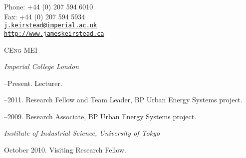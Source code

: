 \documentclass[11pt,a4paper]{article}
\makeatletter
\def\myemail{j.keirstead@imperial.ac.uk}
\def\myweb{http://www.jameskeirstead.ca}
\def\myphone{+44 (0) 207 594 6010}
\def\myfax{+44 (0) 207 594 5934}
\makeatother
\begin{document}
\begin{minipage}[t]{2.95in}
\end{minipage}
\hfill     
\hfill
\begin{minipage}[t]{1.7in}
  \flushright \footnotesize Phone: \myphone \\ 
  Fax: \myfax  \\ 
  {\scriptsize  \texttt{\href{mailto:\myemail}{\myemail}}} \\
  {\scriptsize  \texttt{\href{\myweb}{\myweb}}}
\end{minipage}


\bigskip

\bigskip

 {\scriptsize \textsc{CEng MEI}}
\reversemarginpar
\raggedright

\bigskip

\bigskip


\noindent{}%
%
\emph{Imperial College London \vspace{0.01in}}

--Present. Lecturer.      

--2011. Research Fellow and Team Leader, BP Urban Energy Systems project.

--2009. Research Associate, BP Urban Energy Systems project. \vspace{0.02in}

\medskip

\emph{Institute of Industrial Science, University of Tokyo \vspace{0.01in}}

\ind October 2010.  Visiting Research Fellow.

\bigskip

\end{document}
